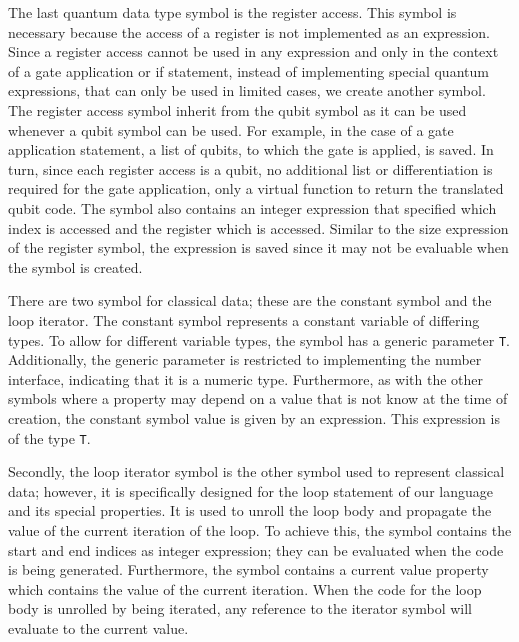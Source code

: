 The last quantum data type symbol is the register access. This symbol is necessary because the access of a register is not implemented as an expression. Since a register access cannot be used in any expression and only in the context of a gate application or if statement, instead of implementing special quantum expressions, that can only be used in limited cases, we create another symbol. The register access symbol inherit from the qubit symbol as it can be used whenever a qubit symbol can be used. For example, in the case of a gate application statement, a list of qubits, to which the gate is applied, is saved. In turn, since each register access is a qubit, no additional list or differentiation is required for the gate application, only a virtual function to return the translated qubit code. The symbol also contains an integer expression that specified which index is accessed and the register which is accessed. Similar to the size expression of the register symbol, the expression is saved since it may not be evaluable when the symbol is created.

There are two symbol for classical data; these are the constant symbol and the loop iterator. The constant symbol represents a constant variable of differing types. To allow for different variable types, the symbol has a generic parameter \texttt{T}. Additionally, the generic parameter is restricted to implementing the number interface, indicating that it is a numeric type. Furthermore, as with the other symbols where a property may depend on a value that is not know at the time of creation, the constant symbol value is given by an expression. This expression is of the type \texttt{T}.

Secondly, the loop iterator symbol is the other symbol used to represent classical data; however, it is specifically designed for the loop statement of our language and its special properties. It is used to unroll the loop body and propagate the value of the current iteration of the loop. To achieve this, the symbol contains the start and end indices as integer expression; they can be evaluated when the code is being generated. Furthermore, the symbol contains a current value property which contains the value of the current iteration. When the code for the loop body is unrolled by being iterated, any reference to the iterator symbol will evaluate to the current value.  

